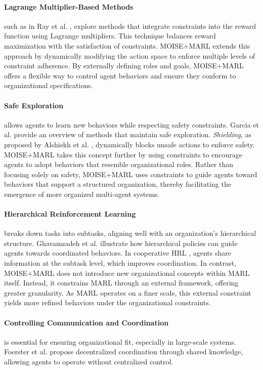 \documentclass[sigconf,anonymous]{aamas}
\begin{document}
\paragraph{Lagrange Multiplier-Based Methods}
such as in Ray et al. \cite{ray2019benchmarking}, explore methods that integrate constraints into the reward function using Lagrange multipliers. This technique balances reward maximization with the satisfaction of constraints. MOISE+MARL extends this approach by dynamically modifying the action space to enforce multiple levels of constraint adherence. By externally defining roles and goals, MOISE+MARL offers a flexible way to control agent behaviors and ensure they conform to organizational specifications.

\paragraph{Safe Exploration}
allows agents to learn new behaviors while respecting safety constraints. Garcia et al. \cite{garcia2015comprehensive} provide an overview of methods that maintain safe exploration. \textit{Shielding}, as proposed by Alshiekh et al. \cite{alshiekh2018safe}, dynamically blocks unsafe actions to enforce safety. MOISE+MARL takes this concept further by using constraints to encourage agents to adopt behaviors that resemble organizational roles. Rather than focusing solely on safety, MOISE+MARL uses constraints to guide agents toward behaviors that support a structured organization, thereby facilitating the emergence of more organized multi-agent systems.

\paragraph{Hierarchical Reinforcement Learning}
breaks down tasks into subtasks, aligning well with an organization’s hierarchical structure. Ghavamzadeh et al. \cite{ghavamzadeh2006hrl} illustrate how hierarchical policies can guide agents towards coordinated behaviors. In cooperative HRL \cite{ghavamzadeh2006cooperative}, agents share information at the subtask level, which improves coordination. In contrast, MOISE+MARL does not introduce new organizational concepts within MARL itself. Instead, it constrains MARL through an external framework, offering greater granularity. As MARL operates on a finer scale, this external constraint yields more refined behaviors under the organizational constraints.

\paragraph{Controlling Communication and Coordination}
is essential for ensuring organizational fit, especially in large-scale systems. Foerster et al. \cite{foerster2018communication} propose decentralized coordination through shared knowledge, allowing agents to operate without centralized control.
\end{document}
